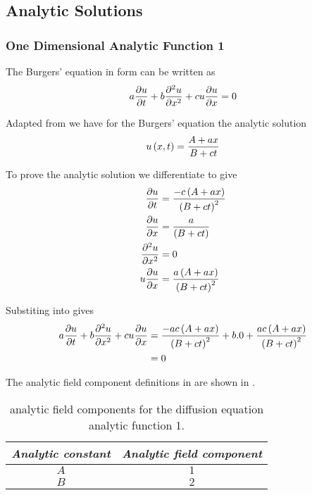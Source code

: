 \subsection{Analytic Solutions}

\subsubsection{One Dimensional Analytic Function 1}

The \oned Burgers' equation in \OpenCMISS form can be written as
\begin{equation}
  a\delby{u}{t}+b\deltwosqby{u}{x}+cu\delby{u}{x}=0
  \label{eqn:OpenCMISSBurgerEquationOneDim}
\end{equation}

Adapted from  we
have for the \oned Burgers' equation the analytic solution
\begin{equation}
  \fnof{u}{x,t}=\dfrac{A+ax}{B+ct}
  \label{eqn:AnalyticBurgersEquationOneDim1}
\end{equation}

To prove the analytic solution we differentiate  to give
\begin{align}
  \delby{u}{t} &= \dfrac{-c\pbrac{A+ax}}{\pbrac{B+ct}^{2}} \\
  \delby{u}{x} &= \dfrac{a}{\pbrac{B+ct}} \\
  \deltwosqby{u}{x} &= 0 \\
  u\delby{u}{x} &= \dfrac{a\pbrac{A+ax}}{\pbrac{B+ct}^{2}} \\
  \label{eqn:AnalyticBurgersEquationOneDim1Derivatives}
\end{align}

Substiting  into  gives
\begin{align}
  a \dfrac{\partial u}{\partial t} +b \dfrac{\partial^{2} u}{\partial {x}^{2}} +cu \dfrac{\partial u}{\partial x}  &=
  \dfrac{-ac\left( A+ax \right)}{\left( B+ct \right)^{2}}+b.0+\dfrac{ac\left( A+ax \right)}{\left( B+ct \right)^{2}}\\
  &= 0
\end{align}

The analytic field component definitions in \OpenCMISS are shown in .

\begin{table}[htb] \centering
  \begin{tabular}{|c|c|} \hline
    \emph{Analytic constant} & \emph{Analytic field component} \\ \hline \hline
    $A$ & $1$ \\ 
    $B$ & $2$ \\  \hline
  \end{tabular}
  \caption{\OpenCMISS analytic field components for the \oned diffusion equation
    analytic function 1.}
  \label{tab:OpenCMISSAnalyticFieldBurgersEquationOneDim1}
\end{table}

